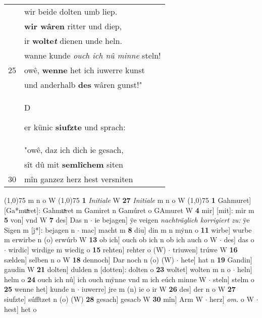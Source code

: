 \documentclass[8pt,a4paper,notitlepage]{article}
\begin{document}
\begin{table}[ht]
\begin{minipage}[t]{0.5\linewidth}
\begin{tabular}{rl}
 & wir beide dolten umb liep.\\ 
 & \textbf{wir wâren} ritter und diep,\\ 
 & ir \textbf{wolte\textit{t}} dienen unde heln.\\ 
 & wanne kunde \textit{ouch ich nû minne} steln!\\ 
25 & owê, \textbf{wenne} het ich iuwerre kunst\\ 
 & und anderhalb \textbf{des} wâren gunst!"\\ 
 & \begin{large}D\end{large}er künic \textbf{siufzte} und sprach:\\ 
 & "owê, daz ich dich ie gesach,\\ 
 & sît dû mit \textbf{semlîchem} siten\\ 
30 & mîn ganzez herz hest versniten\\ 
\end{tabular}
\scriptsize
\line(1,0){75} \newline
m n o W \newline
\line(1,0){75} \newline
\textbf{1} \textit{Initiale} W  \textbf{27} \textit{Initiale} m n o W  \newline
\line(1,0){75} \newline
\textbf{1} Gahmuret] [Ga*muͯret]: Gahmuͯret m Gamiret n Gamúret o GAmuret W \textbf{4} mir] [mit]: mir m \textbf{5} von] vnd W \textbf{7} des] Das n  $\cdot$ ie bejagen] ÿe veigen \textit{nachträglich korrigiert zu:} ÿe Sigen m [j*]: bejagen n  $\cdot$ mac] macht m \textbf{8} diu] din m n mẏnn o \textbf{11} wirbe] wurbe m erwirbe n (o) erwúrb W \textbf{13} ob ich] ouch ob ich n ob ich auch o W  $\cdot$ des] das o  $\cdot$ wirdic] wirdige m wiedig o \textbf{15} rehten] rehter o (W)  $\cdot$ triuwen] trúwe W \textbf{16} sælden] selben n o W \textbf{18} dennoch] Dar noch n (o) (W)  $\cdot$ hete] hat n \textbf{19} Gandin] gaudin W \textbf{21} dolten] dulden n [dotten]: dolten o \textbf{23} woltet] wolten m n o  $\cdot$ heln] helm o \textbf{24} ouch ich nû] ich ouch mÿnne vnd m ich eúch minne W  $\cdot$ steln] stelm o \textbf{25} wenne het] kunde n  $\cdot$ iuwerre] jre m (n) ie o ir W \textbf{26} des] der n o W \textbf{27} siufzte] súfftzet n (o) (W) \textbf{28} gesach] gesacb W \textbf{30} mîn] Arm W  $\cdot$ herz] \textit{om.} o W  $\cdot$ hest] het o \newline
\end{minipage}
\end{table}
\newpage
\end{document}
